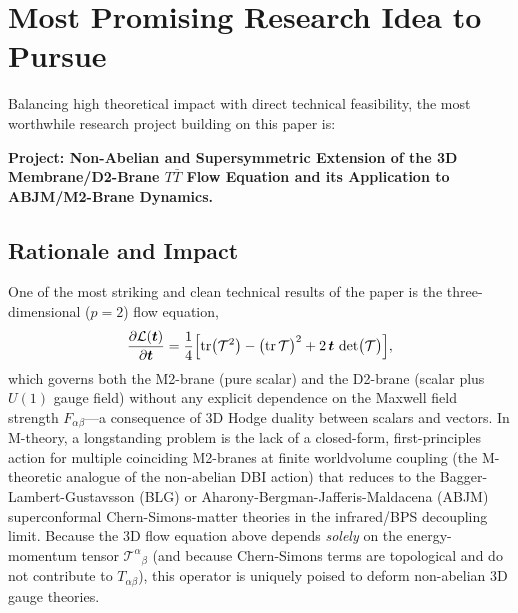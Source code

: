 \documentclass[11pt,a4paper]{article}
\begin{document}
\section{Most Promising Research Idea to Pursue}

Balancing high theoretical impact with direct technical feasibility, the most worthwhile research project building on this paper is:

\medskip
\noindent\textbf{Project: Non-Abelian and Supersymmetric Extension of the 3D Membrane/D2-Brane $T\bar{T}$ Flow Equation and its Application to ABJM/M2-Brane Dynamics.}

\subsection*{Rationale and Impact}
One of the most striking and clean technical results of the paper is the three-dimensional ($p=2$) flow equation,
\begin{equation}
    \frac{\partial \mathcal{L}(\boldsymbol{t})}{\partial \boldsymbol{t}} = \frac{1}{4} \Bigl[ \text{tr}\bigl(\mathcal{T}^2\bigr) - \bigl(\text{tr}\,\mathcal{T}\bigr)^2 + 2\,\boldsymbol{t}\,\det\bigl(\mathcal{T}\bigr) \Bigr],
\end{equation}
which governs both the M2-brane (pure scalar) and the D2-brane (scalar plus $U(1)$ gauge field) without any explicit dependence on the Maxwell field strength $F_{\alpha\beta}$---a consequence of 3D Hodge duality between scalars and vectors. In M-theory, a longstanding problem is the lack of a closed-form, first-principles action for multiple coinciding M2-branes at finite worldvolume coupling (the M-theoretic analogue of the non-abelian DBI action) that reduces to the Bagger-Lambert-Gustavsson (BLG) or Aharony-Bergman-Jafferis-Maldacena (ABJM) superconformal Chern-Simons-matter theories in the infrared/BPS decoupling limit. Because the 3D flow equation above depends \emph{solely} on the energy-momentum tensor $\mathcal{T}^\alpha{}_\beta$ (and because Chern-Simons terms are topological and do not contribute to $T_{\alpha\beta}$), this operator is uniquely poised to deform non-abelian 3D gauge theories.
\end{document}
